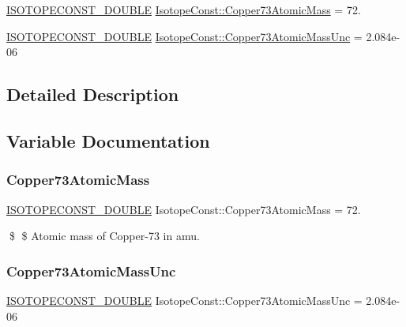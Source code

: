\begin{DoxyCompactItemize}
\item 
\mbox{\hyperlink{group___isotope_const-_macros_ga8f45a7272ce02c0b4c65c44636ed719a}{I\+S\+O\+T\+O\+P\+E\+C\+O\+N\+S\+T\+\_\+\+D\+O\+U\+B\+LE}} \mbox{\hyperlink{group___isotope_const-_copper-_cu73_ga62bcc6896da410e35afdfe078fe31016}{Isotope\+Const\+::\+Copper73\+Atomic\+Mass}} = 72.
\item 
\mbox{\hyperlink{group___isotope_const-_macros_ga8f45a7272ce02c0b4c65c44636ed719a}{I\+S\+O\+T\+O\+P\+E\+C\+O\+N\+S\+T\+\_\+\+D\+O\+U\+B\+LE}} \mbox{\hyperlink{group___isotope_const-_copper-_cu73_ga59f7722dfe3fd32baca378d8e9398ba2}{Isotope\+Const\+::\+Copper73\+Atomic\+Mass\+Unc}} = 2.\+084e-\/06
\end{DoxyCompactItemize}


\subsection{Detailed Description}


\subsection{Variable Documentation}
\mbox{\label{group___isotope_const-_copper-_cu73_ga62bcc6896da410e35afdfe078fe31016}} 
\subsubsection{\texorpdfstring{Copper73\+Atomic\+Mass}{Copper73AtomicMass}}
{\footnotesize\ttfamily \mbox{\hyperlink{group___isotope_const-_macros_ga8f45a7272ce02c0b4c65c44636ed719a}{I\+S\+O\+T\+O\+P\+E\+C\+O\+N\+S\+T\+\_\+\+D\+O\+U\+B\+LE}} Isotope\+Const\+::\+Copper73\+Atomic\+Mass = 72.}

\$ \$ Atomic mass of Copper-\/73 in amu. \mbox{\label{group___isotope_const-_copper-_cu73_ga59f7722dfe3fd32baca378d8e9398ba2}} 
\subsubsection{\texorpdfstring{Copper73\+Atomic\+Mass\+Unc}{Copper73AtomicMassUnc}}
{\footnotesize\ttfamily \mbox{\hyperlink{group___isotope_const-_macros_ga8f45a7272ce02c0b4c65c44636ed719a}{I\+S\+O\+T\+O\+P\+E\+C\+O\+N\+S\+T\+\_\+\+D\+O\+U\+B\+LE}} Isotope\+Const\+::\+Copper73\+Atomic\+Mass\+Unc = 2.\+084e-\/06}

